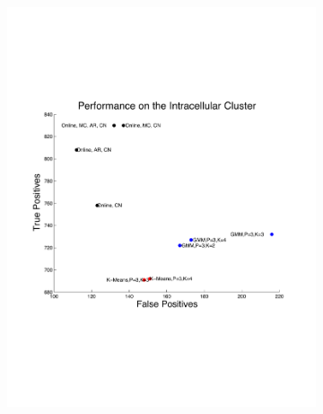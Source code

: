 \begin{center}
\begin{figure}
\begin{subfigure}[b]{.5\textwidth}
\centering
\includegraphics[width=\textwidth]{../figs/truefalsepositive}
\caption{}
\label{hc1res}
\end{subfigure}
\begin{subfigure}[b]{.5\textwidth}

\end{subfigure}
\end{figure}
\end{center}
